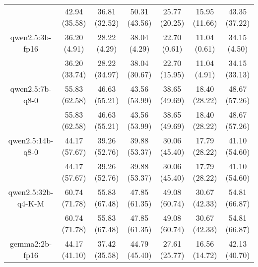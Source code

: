 \begin{table}[]
{\begin{tabular}{ccccccc}
      \multicolumn{1}{c|}{} & 42.94 (35.58) & 36.81 (32.52) & \multicolumn{1}{c|}{50.31 (43.56)} & 25.77 (20.25) & \multicolumn{1}{c|}{15.95 (11.66)} & 43.35 (37.22) \\
      \cline{1-7}


      \multicolumn{1}{c|}{qwen2.5:3b-fp16} & 36.20 (4.91) & 28.22 (4.29) & \multicolumn{1}{c|}{38.04 (4.29)} & 22.70 (0.61) & \multicolumn{1}{c|}{11.04 (0.61)} & 34.15 (4.50) \\



      \multicolumn{1}{c|}{} & 36.20 (33.74) & 28.22 (34.97) & \multicolumn{1}{c|}{38.04 (30.67)} & 22.70 (15.95) & \multicolumn{1}{c|}{11.04 (4.91)} & 34.15 (33.13) \\
      \cline{1-7}


      \multicolumn{1}{c|}{qwen2.5:7b-q8-0} & 55.83 (62.58) & 46.63 (55.21) & \multicolumn{1}{c|}{43.56 (53.99)} & 38.65 (49.69) & \multicolumn{1}{c|}{18.40 (28.22)} & 48.67 (57.26) \\



      \multicolumn{1}{c|}{} & 55.83 (62.58) & 46.63 (55.21) & \multicolumn{1}{c|}{43.56 (53.99)} & 38.65 (49.69) & \multicolumn{1}{c|}{18.40 (28.22)} & 48.67 (57.26) \\
      \cline{1-7}


      \multicolumn{1}{c|}{qwen2.5:14b-q8-0} & 44.17 (57.67) & 39.26 (52.76) & \multicolumn{1}{c|}{39.88 (53.37)} & 30.06 (45.40) & \multicolumn{1}{c|}{17.79 (28.22)} & 41.10 (54.60) \\



      \multicolumn{1}{c|}{} & 44.17 (57.67) & 39.26 (52.76) & \multicolumn{1}{c|}{39.88 (53.37)} & 30.06 (45.40) & \multicolumn{1}{c|}{17.79 (28.22)} & 41.10 (54.60) \\
      \cline{1-7}


      \multicolumn{1}{c|}{qwen2.5:32b-q4-K-M} & 60.74 (71.78) & 55.83 (67.48) & \multicolumn{1}{c|}{47.85 (61.35)} & 49.08 (60.74) & \multicolumn{1}{c|}{30.67 (42.33)} & 54.81 (66.87) \\



      \multicolumn{1}{c|}{} & 60.74 (71.78) & 55.83 (67.48) & \multicolumn{1}{c|}{47.85 (61.35)} & 49.08 (60.74) & \multicolumn{1}{c|}{30.67 (42.33)} & 54.81 (66.87) \\
      \cline{1-7}


      \multicolumn{1}{c|}{gemma2:2b-fp16} & 44.17 (41.10) & 37.42 (35.58) & \multicolumn{1}{c|}{44.79 (45.40)} & 27.61 (25.77) & \multicolumn{1}{c|}{16.56 (14.72)} & 42.13 (40.70) \\




\end{tabular}}
\end{table}

